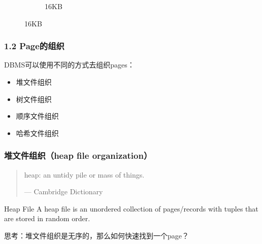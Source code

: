 \documentclass[aspectratio=169, 14pt]{beamer}
\begin{document}
\begin{frame}[fragile]
\begin{figure}
\begin{subfigure}[b]{0.3\textwidth}
        \caption{16KB}
    \end{subfigure}
\end{figure}

\end{frame}

\begin{frame}
    \frametitle{1.2 Page的组织}
DBMS可以使用不同的方式去组织pages：

\begin{itemize}
    \item 堆文件组织
    \item 树文件组织
    \item 顺序文件组织
    \item 哈希文件组织
\end{itemize}


\end{frame}

\begin{frame}
    \frametitle{堆文件组织（heap file organization）}

    \begin{quote}
        heap: an untidy pile or mass of things.
        \begin{flushright}
            --- Cambridge Dictionary
        \end{flushright}
    \end{quote}

    \begin{exampleblock}{Heap File}
A heap file is an unordered collection of pages/records with tuples that are stored in random order.        
    \end{exampleblock}

 思考：堆文件组织是无序的，那么如何快速找到一个page？
\end{frame}
\end{document}
